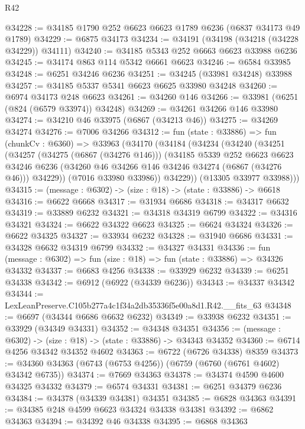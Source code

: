 \begin{lexlean}{R42}
\begin{coremodule}
{@34228 := @34185 @1790 @252 @6623 @6623 @1789 @6236 (@6837 @34173 @49 @1789)
@34229 := @6875 @34173
@34234 := @34191 (@34198 (@34218 (@34228 @34229)) @34111)
@34240 := @34185 @5343 @252 @6663 @6623 @33988 @6236
@34245 := @34174 @863 @114 @5342 @6661 @6623
@34246 := @6584 @33985
@34248 := @6251 @34246 @6236
@34251 := @34245 (@33981 @34248) @33988
@34257 := @34185 @5337 @5341 @6623 @6625 @33980 @34248
@34260 := @6974 @34173 @248 @6623
@34261 := @34260 @146
@34266 := @33981 (@6251 (@824 (@6579 @33974)) @34248)
@34269 := @34261 @34266 @146 @33980
@34274 := @34210 @46 @33975 (@6867 (@34213 @46))
@34275 := @34269 @34274
@34276 := @7006 @34266
@34312 := fun (state : @33886) =>
  fun (chunkCv : @6360) =>
  @33963
    (@34170
      (@34184
        (@34234
          (@34240
            (@34251
              (@34257
                (@34275 (@6867 (@34276 @146)))
                (@34185
                  @5339
                  @252
                  @6623
                  @6623
                  @34246
                  @6236
                  (@34260 @46 @34266 @146 @34246 @34274 (@6867 (@34276 @46)))
                  @34229))
              (@7016 @33980 @33986))
            @34229))
        (@13305 @33977 @33988)))
@34315 := (message : @6302) -> (size : @18) -> (state : @33886) -> @6618
@34316 := @6622 @6668
@34317 := @31934 @6686
@34318 := @34317 @6632
@34319 := @33889 @6232
@34321 := @34318 @34319 @6799
@34322 := @34316 @34321
@34324 := @6622 @34322 @6623
@34325 := @6624 @34324
@34326 := @6622 @34325
@34327 := @33934 @6232
@34328 := @31940 @6686
@34331 := @34328 @6632 @34319 @6799
@34332 := @34327 @34331
@34336 := fun (message : @6302) => fun (size : @18) => fun (state : @33886) => @34326 @34332
@34337 := @6683 @4256
@34338 := @33929 @6232
@34339 := @6251 @34338
@34342 := @6912 (@6922 (@34339 @6236))
@34343 := @34337 @34342
@34344 := LexLeanPreserve.C105b277a4c1f34a2db35336f5e00a8d1.R42.__fits_63
@34348 := @6697 (@34344 @6686 @6632 @6232)
@34349 := @33938 @6232
@34351 := @33929 (@34349 @34331)
@34352 := @34348 @34351
@34356 := (message : @6302) -> (size : @18) -> (state : @33886) -> @34343 @34352
@34360 := @6714 @4256 @34342 @34352 @4602
@34363 := @6722 (@6726 @34338) @8359
@34373 := @34360 @34363 (@6743 (@6753 @4256)) (@6759 (@6760 (@6761 @4602) @34342 @6735))
@34374 := @7669 @34363
@34378 := @34374 @4590 @4600 @34325 @34332
@34379 := @6574 @34331
@34381 := @6251 @34379 @6236
@34384 := @34378 (@34339 @34381) @34351
@34385 := @6828 @34363
@34391 := @34385 @248 @4599 @6623 @34324 @34338 @34381
@34392 := @6862 @34363
@34394 := @34392 @46 @34338
@34395 := @6868 @34363
}
\end{coremodule}
\end{lexlean}
